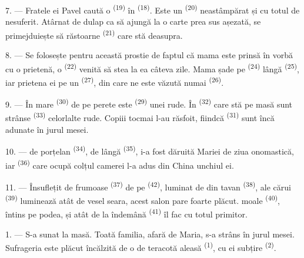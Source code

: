 \VUsaut{5.0mm}
\VUsaut{3.0mm}

7. --- Fratele ei Pavel caută o  \textsuperscript{(19)} în
 \textsuperscript{(18)}. Este un 
\textsuperscript{(20)} neastâmpărat și cu totul de nesuferit. Atârnat de dulap ca
să ajungă la o carte prea sus așezată, se primejduiește să răstoarne
 \textsuperscript{(21)} care stă deasupra.

8. --- Se folosește pentru această prostie de faptul că mama este prinsă în vorbă
cu o prietenă, o  \textsuperscript{(22)} venită să stea la ea
câteva zile. Mama șade pe  \textsuperscript{(24)} lângă
 \textsuperscript{(25)}, iar prietena ei pe un 
\textsuperscript{(27)}, din care ne este văzută numai 
\textsuperscript{(26)}.

9. --- În  mare \textsuperscript{(30)} de pe perete este
 \textsuperscript{(29)} unei rude. În 
\textsuperscript{(32)} care stă pe masă sunt strânse 
\textsuperscript{(33)} celorlalte rude. Copiii tocmai l-au răsfoit, fiindcă
 \textsuperscript{(31)} sunt încă adunate în jurul mesei.

10. ---  de porțelan \textsuperscript{(34)}, de lângă
 \textsuperscript{(35)}, i-a fost dăruită Mariei de ziua
onomastică, iar  \textsuperscript{(36)} care ocupă colțul camerei
l-a adus din China unchiul ei.

11. --- Însuflețit de  frumoase \textsuperscript{(37)} de pe
 \textsuperscript{(42)}, luminat de  din tavan
\textsuperscript{(38)}, ale cărui 
\textsuperscript{(39)} luminează atât de vesel seara, acest salon pare foarte
plăcut.  moale \textsuperscript{(40)}, întins pe podea, și
 atât de la îndemână \textsuperscript{(41)} îl fac cu
totul primitor.

\VUsaut{3.6mm}
\VUsaut{3.0mm}

1. --- S-a sunat la masă. Toată familia, afară de Maria, s-a strâns în jurul mesei.
Sufrageria este plăcut încălzită de o  de teracotă aleasă
\textsuperscript{(1)}, cu  ei subțire \textsuperscript{(2)}.

